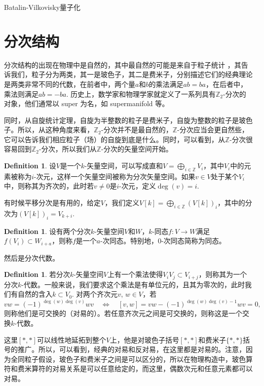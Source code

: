 \documentclass[11pt]{article}
\theoremstyle{definition}
\newtheorem{defi}[para]{Definition}
\theoremstyle{plain}
\begin{document}
Batalin-Vilkovisky量子化

\section{分次结构}

分次结构的出现在物理中是自然的，其中最自然的可能是来自于粒子统计%
，其告诉我们，粒子分为两类，其一是玻色子，其二是费米子，分别描述它们的经典理论是两类非常不同的代数，在前者中，两个量$a$和$b$的乘法满足$ab=ba$，在后者中，乘法则满足$ab=-ba$. 历史上，数学家和物理学家就定义了一系列具有$\mathbb{Z}_2$-分次的对象，他们通常以 super 为名，如 supermanifold 等。

同时，从自旋统计定理，自旋为半整数的粒子是费米子，自旋为整数的粒子是玻色子。所以，从这种角度来看，$\mathbb{Z}_2$-分次并不是最自然的，$\mathbb{Z}$-分次应当会更自然些，它可以告诉我们相应粒子（场）的自旋到底是什么。同时，可以看到，从$\mathbb Z$-分次很容易回到$\mathbb Z_2$-分次，所以我们从$\mathbb{Z}$-分次的矢量空间开始。

\begin{defi}
    设$V$是一个$k$-矢量空间，可以写成直和$V=\bigoplus_{i\in\mathbb Z} V_i$，其中$V_i$中的元素被称为$i$-次元，这样一个矢量空间被称为分次矢量空间。如果$v\in V$处于某个$V_i$中，则称其为齐次的，此时若$v\neq 0$是$i$-次元，定义$\deg(v)=i$. 
\end{defi}

有时候平移分次是有用的，给定$V$，我们定义$V[k]=\bigoplus_{i\in\mathbb Z} (V[k])_i$，其中的分次为$(V[k])_i=V_{k+i}$. 

\begin{defi}
    设有两个分次$k$-矢量空间$V$和$W$，$k$-同态$f:V\to W$满足$f(V_i)\subset W_{i+a}$，则称$f$是一个$a$-次同态。特别地，$0$-次同态简称为同态。
\end{defi}

然后是分次代数。

\begin{defi}
    若分次$k$-矢量空间$V$上有一个乘法使得$V_iV_j\subset V_{i+j}$，则称其为一个分次$k$-代数。一般来说，我们要求这个乘法是有单位元的，且其为零次的，此时我们有自然的含入$k\subset V_0$. 对两个齐次元$v$, $w\in V$，若
\[
    vw=(-1)^{\deg(w)\deg(v)}wv\quad \Leftrightarrow \quad 
    [v,w]=vw-(-1)^{\deg(w)\deg(v)-1}wv=0,
\]
则称他们是可交换的（对易的）。若任意齐次元之间是可交换的，则称这是一个交换$k$-代数。
\end{defi}

这里$[*,*]$可以线性地延拓到整个$V$上，他是对玻色子括号$[*,*]$和费米子$\{*,*\}$括号的推广。所以，可以看到，经典的对易和反对易，在这里都是对易的。注意，因为全同粒子假设，玻色子和费米子之间是可以区分的，所以在物理构造中，玻色算符和费米算符的对易关系是可以任意给定的，而这里，偶数次元和任意元素都可以对易。
\end{document}
